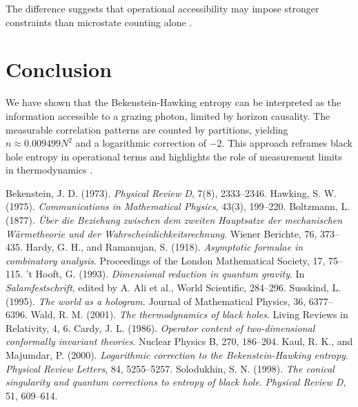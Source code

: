 \documentclass[12pt, letterpaper]{article}
\begin{document}
The difference suggests that operational accessibility may impose stronger constraints than microstate counting alone \cite{wald2001}.

\section{Conclusion}

We have shown that the Bekenstein-Hawking entropy can be interpreted as the information accessible to a grazing photon, limited by horizon causality. The measurable correlation patterns are counted by partitions, yielding $n \approx 0.009499 N^2$ and a logarithmic correction of $-2$. This approach reframes black hole entropy in operational terms and highlights the role of measurement limits in thermodynamics \cite{boltzmann1877}.

\begin{thebibliography}{9}
 Bekenstein, J. D. (1973). \textit{Physical Review D}, 7(8), 2333–2346.
 Hawking, S. W. (1975). \textit{Communications in Mathematical Physics}, 43(3), 199–220.
 Boltzmann, L. (1877). \textit{Über die Beziehung zwischen dem zweiten Hauptsatze der mechanischen Wärmetheorie und der Wahrscheinlichkeitsrechnung}. Wiener Berichte, 76, 373–435.
 Hardy, G. H., and Ramanujan, S. (1918). \textit{Asymptotic formulae in combinatory analysis}. Proceedings of the London Mathematical Society, 17, 75–115.
 't Hooft, G. (1993). \textit{Dimensional reduction in quantum gravity}. In \textit{Salamfestschrift}, edited by A. Ali et al., World Scientific, 284–296.
 Susskind, L. (1995). \textit{The world as a hologram}. Journal of Mathematical Physics, 36, 6377–6396.
 Wald, R. M. (2001). \textit{The thermodynamics of black holes}. Living Reviews in Relativity, 4, 6.
 Cardy, J. L. (1986). \textit{Operator content of two-dimensional conformally invariant theories}. Nuclear Physics B, 270, 186–204.
 Kaul, R. K., and Majumdar, P. (2000). \textit{Logarithmic correction to the Bekenstein-Hawking entropy}. \textit{Physical Review Letters}, 84, 5255–5257.
 Solodukhin, S. N. (1998). \textit{The conical singularity and quantum corrections to entropy of black hole}. \textit{Physical Review D}, 51, 609–614.
\end{thebibliography}
\end{document}
